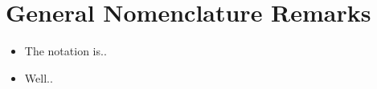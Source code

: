 \section*{General Nomenclature Remarks}
\vspace{0.1cm}
\begin{itemize}
\item The notation is..
\item Well..
\end{itemize}